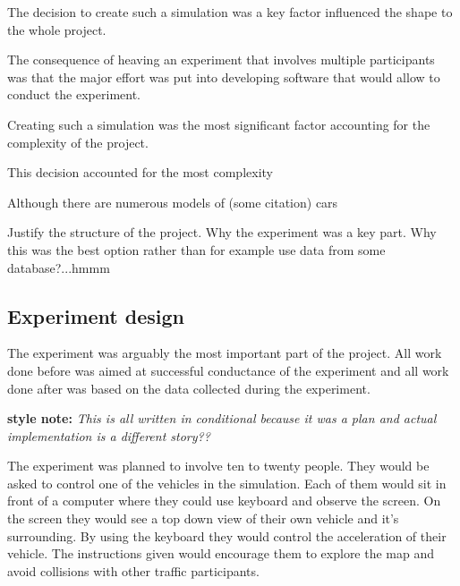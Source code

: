 \documentclass[11pt]{article}
\begin{document}
The decision to create such a simulation was a key factor influenced the shape to the whole project. 


The consequence of heaving an experiment that involves multiple participants was that the major effort was put into developing software that would allow to conduct the experiment.  



Creating such a simulation was the most significant factor accounting for the complexity of the project. 



This decision accounted for the most complexity 



Although there are numerous models of (some citation) cars 


Justify the structure of the project. Why the experiment was a key part. Why this was
the best option rather than for example use data from some database?...hmmm

\subsection{Experiment design}
The experiment was arguably the most important part of the project. All work done before was aimed at successful conductance of the experiment and all work done after was based on the data collected during the experiment. 


\textbf{style note:} \textit{This is all written in conditional because it was a plan and actual implementation is a different story??}

The experiment was planned to involve ten to twenty people. They would be asked to control one of the vehicles in the simulation. Each of them would sit in front of a computer where they could use keyboard and observe the screen.  On the screen they would see a top down view of their own vehicle and it's surrounding. By using the keyboard they would control the acceleration of their vehicle.
The instructions given would encourage them to explore the map and avoid collisions with other traffic participants.
\end{document}
